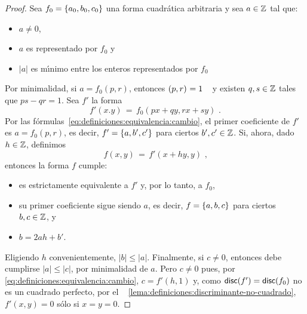 \begin{proof}
	Sea $f_0=\left\{a_0,b_0,c_0\right\}$ una forma cuadr\'atica arbitraria
	y sea $a\in\mathbb{Z}$ tal que:
	\begin{itemize}
		\item $a\neq 0$,
		\item $a$ es representado por $f_0$ y
		\item $|a|$ es m\'{\i}nimo entre los enteros representados
			por $f_0$
	\end{itemize}
	Por minimalidad, si $a=f_0(p,r)$, entonces $\left({p,r}\right)_{}=1$
	\quedacomoejercicio~
	y existen $q,s\in\mathbb{Z}$ tales que $ps-qr=1$. Sea $f'$ la forma
	\begin{displaymath}
		f'(x.y)\,=\,f_0(px+qy,rx+sy)
		\text{ .}
	\end{displaymath}
	Por las f\'ormulas~\eqref{eq:definiciones:equivalencia:cambio},
	el primer coeficiente de $f'$ es $a=f_0(p,r)$, es decir,
	$f'=\left\{a,b',c'\right\}$ para ciertos $b',c'\in\mathbb{Z}$.
	Si, ahora, dado $h\in\mathbb{Z}$, definimos
	\begin{displaymath}
		f(x,y)\,=\,f'(x+hy,y)
		\text{ ,}
	\end{displaymath}
	entonces la forma $f$ cumple:
	\begin{itemize}
		\item es estrictamente equivalente a $f'$ y,
			por lo tanto, a $f_0$,
		\item su primer coeficiente sigue siendo $a$,
			es decir, $f=\left\{a,b,c\right\}$ para ciertos
			$b,c\in\mathbb{Z}$, y
		\item $b=2ah+b'$.
	\end{itemize}
	Eligiendo $h$ convenientemente, $|b|\leq |a|$. Finalmente,
	si $c\neq 0$, entonces debe cumplirse $|a|\leq |c|$, por
	minimalidad de $a$. Pero $c\neq 0$ pues, por~%
	\eqref{eq:definiciones:equivalencia:cambio}, $c=f'(h,1)$ y,
	como $\mathsf{disc}(f')=\mathsf{disc}(f_0)$ no es un cuadrado
	perfecto, por el \lemaname~%
	\ref{lema:definiciones:discriminante-no-cuadrado},
	$f'(x,y)=0$ s\'olo si $x=y=0$.
\end{proof}

% 

